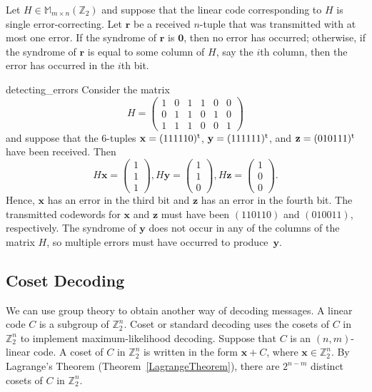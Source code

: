  
\begin{theorem}
Let $H \in {\mathbb M}_{ m \times n} ( {\mathbb Z}_2)$ and suppose that the
linear code corresponding to $H$ is single error-correcting. Let
${\mathbf r}$ be a received $n$-tuple that was transmitted with at most
one error. If the syndrome of ${\mathbf r}$ is ${\mathbf 0}$, then no
error has occurred; otherwise, if the syndrome of ${\mathbf r}$ is equal
to some column of $H$, say the $i$th column, then the error has
occurred in the $i$th bit.  
\end{theorem}
 
 
\begin{example}{detecting_errors}
Consider the matrix
\[
H =
\begin{pmatrix}
1 & 0 & 1 & 1 & 0 & 0 \\
0 & 1 & 1 & 0 & 1 & 0 \\
1 & 1 & 1 & 0 & 0 & 1
\end{pmatrix}
\]
and suppose that the  6-tuples ${\mathbf x} = (111110)^{\rm t}$,
${\mathbf y} = (111111)^{\rm t}$, and ${\mathbf z} = (010111)^{\rm t}$
have been received. Then  
\[
H{\mathbf x} =
\begin{pmatrix}
1 \\ 1 \\ 1 
\end{pmatrix},
H{\mathbf y} =
\begin{pmatrix}
1 \\ 1 \\ 0 
\end{pmatrix},
H{\mathbf z} =
\begin{pmatrix}
1 \\ 0 \\ 0
\end{pmatrix}.
\]
Hence, ${\mathbf x}$ has an error in the third bit and ${\mathbf z}$ has
an error in the fourth bit. The transmitted codewords for ${\mathbf x}$
and ${\mathbf z}$ must have been $(110110)$ and $(010011)$,
respectively. The syndrome of ${\mathbf y}$ does not occur in any of the
columns of the matrix $H$, so multiple
errors must have occurred to produce~${\mathbf y}$.
\end{example}
 
 
\subsection*{Coset Decoding}
 
 
We can use group theory to obtain another way of decoding messages.  A
linear code $C$ is a subgroup of ${\mathbb Z}_2^n$. {\bfi
Coset\/} or {\bfi standard
decoding\/} uses the cosets of $C$ in ${\mathbb
Z}_2^n$ to implement maximum-likelihood decoding. Suppose that $C$ is
an $(n,m)$-linear code. A coset of $C$ in ${\mathbb Z}_2^n$ is written in
the form ${\mathbf x} + C$, where ${\mathbf x} \in {\mathbb Z}_2^n$. By
Lagrange's Theorem (Theorem~\ref{LagrangeTheorem}), there are $2^{n-m}$ distinct cosets of $C$ in 
${\mathbb Z}_2^n$.
 
